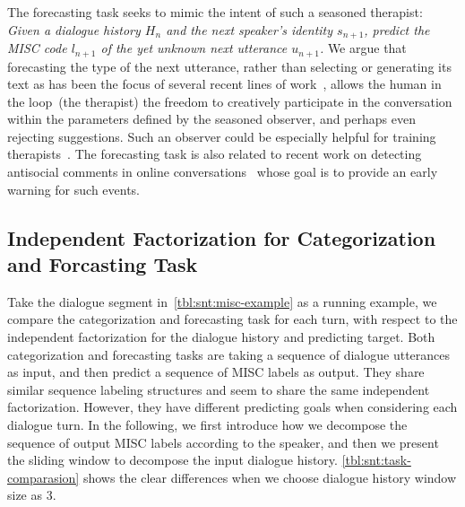 The forecasting task seeks to mimic the intent of such a seasoned
therapist: \emph{Given a dialogue history $H_n$ and the next speaker's
  identity $s_{n+1}$, predict the MISC code $l_{n+1}$ of the yet
  unknown next utterance $u_{n+1}$.}
We argue that forecasting the type of the next utterance, rather than
selecting or generating its text as has been the focus of several
recent lines of work~\citep[\eg,][]{schatzmann2005quantitative,ubuntu,DSTC7},
allows the human in the loop~(the therapist) the freedom to
creatively participate in the conversation within the parameters
defined by the seasoned observer, and perhaps even rejecting
suggestions. Such an observer could be especially helpful for
training therapists~\citep{imel2017technology}.
%
The forecasting task is also related to recent work on detecting
antisocial comments in online
conversations~\citep{zhang2018conversations} whose goal is to
provide an early warning for such events.


\subsection{Independent Factorization for Categorization and
  Forcasting Task}
\label{ssec:snt:comparative-tasks}

Take the dialogue segment in~\autoref{tbl:snt:misc-example} as a
running example, we compare the categorization and forecasting task
for each turn, with respect to the independent factorization for the
dialogue history and predicting target. Both categorization and
forecasting tasks are taking a sequence of dialogue utterances as
input, and then predict a sequence of MISC labels as output. They
share similar sequence labeling structures and seem to share the
same independent factorization. However, they have different
predicting goals when considering each dialogue turn. In the
following, we first introduce how we decompose the sequence of output
MISC labels according to the speaker, and then we present the
sliding window to decompose the input dialogue
history. \autoref{tbl:snt:task-comparasion} shows the clear
differences when we choose dialogue history window size as 3.

